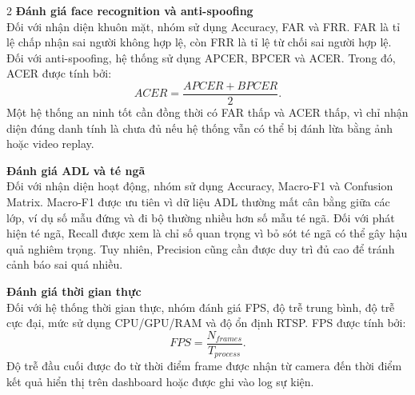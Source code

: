\documentclass[a4paper, twoside, 12pt]{article}
\begin{document}
\begin{multicols}{2}
\vspace{0.1cm}
\hspace*{0.5cm}\textbf{Đánh giá face recognition và anti-spoofing}\\
Đối với nhận diện khuôn mặt, nhóm sử dụng Accuracy, FAR và FRR. FAR là tỉ lệ chấp nhận sai người không hợp lệ, còn FRR là tỉ lệ từ chối sai người hợp lệ. Đối với anti-spoofing, hệ thống sử dụng APCER, BPCER và ACER. Trong đó, ACER được tính bởi:
\begin{equation}
ACER=\frac{APCER+BPCER}{2}.
\label{eq:acer}
\end{equation}
Một hệ thống an ninh tốt cần đồng thời có FAR thấp và ACER thấp, vì chỉ nhận diện đúng danh tính là chưa đủ nếu hệ thống vẫn có thể bị đánh lừa bằng ảnh hoặc video replay.

\vspace{0.1cm}
\hspace*{0.5cm}\textbf{Đánh giá ADL và té ngã}\\
Đối với nhận diện hoạt động, nhóm sử dụng Accuracy, Macro-F1 và Confusion Matrix. Macro-F1 được ưu tiên vì dữ liệu ADL thường mất cân bằng giữa các lớp, ví dụ số mẫu đứng và đi bộ thường nhiều hơn số mẫu té ngã. Đối với phát hiện té ngã, Recall được xem là chỉ số quan trọng vì bỏ sót té ngã có thể gây hậu quả nghiêm trọng. Tuy nhiên, Precision cũng cần được duy trì đủ cao để tránh cảnh báo sai quá nhiều.

\vspace{0.1cm}
\hspace*{0.5cm}\textbf{Đánh giá thời gian thực}\\
Đối với hệ thống thời gian thực, nhóm đánh giá FPS, độ trễ trung bình, độ trễ cực đại, mức sử dụng CPU/GPU/RAM và độ ổn định RTSP. FPS được tính bởi:
\begin{equation}
FPS=\frac{N_{frames}}{T_{process}}.
\label{eq:fps}
\end{equation}
Độ trễ đầu cuối được đo từ thời điểm frame được nhận từ camera đến thời điểm kết quả hiển thị trên dashboard hoặc được ghi vào log sự kiện.


\end{multicols}
\end{document}

